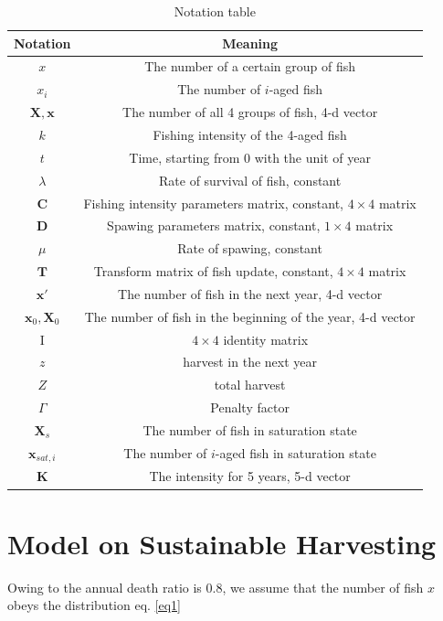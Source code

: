\documentclass{IEEEtran}
\begin{document}
\begin{table}[h]
    \centering
    \caption{Notation table}
    \label{notations}
    \begin{tabular}{cc}
        \toprule
        Notation & Meaning \\ \midrule
        $x$ & The number of a certain group of fish \\
        $x_i$ & The number of $i$-aged fish \\
        $\bm X, \bm x$ & The number of all 4 groups of fish, 4-d vector\\
        $k$ & Fishing intensity of the 4-aged fish \\
        $t$ & Time, starting from 0 with the unit of year \\
        $\lambda$ & Rate of survival of fish, constant \\
        $\pmb C$ & Fishing intensity parameters matrix, constant, $4 \times 4$ matrix\\
        $\pmb D$ & Spawing parameters matrix, constant, $1 \times 4$ matrix\\
        $\mu$ & Rate of spawing, constant \\
        $\pmb T$ & Transform matrix of fish update, constant, $4 \times 4$ matrix\\
        $\bm x'$ & The number of fish in the next year, 4-d vector\\
        $\bm x_0, \bm X_0$ & The number of fish in the beginning of the year, 4-d vector\\
        $\mathrm I$ & $4 \times 4$ identity matrix\\
        $z$ & harvest in the next year\\
        $Z$ & total harvest\\
        $\Gamma$ & Penalty factor\\
        $\bm X_s$ & The number of fish in saturation state\\
        $\bm x_{sat,i}$ & The number of $i$-aged fish in saturation state\\
        $\bm K$ & The intensity for 5 years, 5-d vector\\
        \bottomrule
    \end{tabular}
\end{table}

\section{Model on Sustainable Harvesting} \label{model1}
Owing to the annual death ratio is 0.8, we assume that the number of fish $x$ obeys the distribution eq. \ref{eq1}
\end{document}
